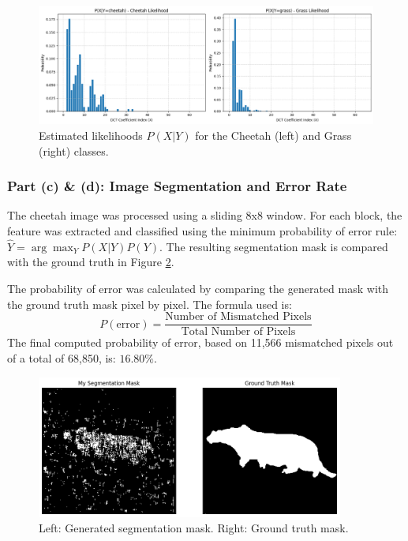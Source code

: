 \begin{figure}[h!]
    \centering
    \includegraphics[width=1.0\textwidth]{hw1_likelihoods.png}
    \caption{Estimated likelihoods $P(X|Y)$ for the Cheetah (left) and Grass (right) classes.}
    \label{fig:hw1_likelihoods}
\end{figure}

\subsubsection{Part (c) \& (d): Image Segmentation and Error Rate}
The cheetah image was processed using a sliding 8x8 window. For each block, the feature was extracted and classified using the minimum probability of error rule: $\hat{Y} = \arg\max_{Y} P(X|Y)P(Y)$. The resulting segmentation mask is compared with the ground truth in Figure \ref{fig:hw1_segmentation}.

The probability of error was calculated by comparing the generated mask with the ground truth mask pixel by pixel. The formula used is:
$$
P(\text{error}) = \frac{\text{Number of Mismatched Pixels}}{\text{Total Number of Pixels}}
$$
The final computed probability of error, based on 11,566 mismatched pixels out of a total of 68,850, is: $\mathbf{16.80\%}$.

\begin{figure}[h!]
    \centering
    \includegraphics[width=0.9\textwidth]{hw1_segmentation.png}
    \caption{Left: Generated segmentation mask. Right: Ground truth mask.}
    \label{fig:hw1_segmentation}
\end{figure}

